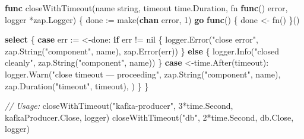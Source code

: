 \documentclass[
]{article}
\newenvironment{Shaded}{}{}
\newcommand{\BuiltInTok}[1]{\textcolor[rgb]{0.00,0.50,0.00}{#1}}
\newcommand{\CommentTok}[1]{\textcolor[rgb]{0.38,0.63,0.69}{\textit{#1}}}
\newcommand{\ControlFlowTok}[1]{\textcolor[rgb]{0.00,0.44,0.13}{\textbf{#1}}}
\newcommand{\DataTypeTok}[1]{\textcolor[rgb]{0.56,0.13,0.00}{#1}}
\newcommand{\DecValTok}[1]{\textcolor[rgb]{0.25,0.63,0.44}{#1}}
\newcommand{\KeywordTok}[1]{\textcolor[rgb]{0.00,0.44,0.13}{\textbf{#1}}}
\newcommand{\NormalTok}[1]{#1}
\newcommand{\OperatorTok}[1]{\textcolor[rgb]{0.40,0.40,0.40}{#1}}
\newcommand{\OtherTok}[1]{\textcolor[rgb]{0.00,0.44,0.13}{#1}}
\newcommand{\StringTok}[1]{\textcolor[rgb]{0.25,0.44,0.63}{#1}}
\begin{document}
\begin{Shaded}
\begin{Highlighting}[]
\KeywordTok{func}\NormalTok{ closeWithTimeout}\OperatorTok{(}\NormalTok{name }\DataTypeTok{string}\OperatorTok{,}\NormalTok{ timeout time}\OperatorTok{.}\NormalTok{Duration}\OperatorTok{,}\NormalTok{ fn }\KeywordTok{func}\OperatorTok{()} \DataTypeTok{error}\OperatorTok{,}\NormalTok{ logger }\OperatorTok{*}\NormalTok{zap}\OperatorTok{.}\NormalTok{Logger}\OperatorTok{)} \OperatorTok{\{}
\NormalTok{    done }\OperatorTok{:=} \BuiltInTok{make}\OperatorTok{(}\KeywordTok{chan} \DataTypeTok{error}\OperatorTok{,} \DecValTok{1}\OperatorTok{)}
    \ControlFlowTok{go} \KeywordTok{func}\OperatorTok{()} \OperatorTok{\{}\NormalTok{ done }\OperatorTok{\textless{}{-}}\NormalTok{ fn}\OperatorTok{()} \OperatorTok{\}()}

    \ControlFlowTok{select} \OperatorTok{\{}
    \ControlFlowTok{case}\NormalTok{ err }\OperatorTok{:=} \OperatorTok{\textless{}{-}}\NormalTok{done}\OperatorTok{:}
        \ControlFlowTok{if}\NormalTok{ err }\OperatorTok{!=} \OtherTok{nil} \OperatorTok{\{}
\NormalTok{            logger}\OperatorTok{.}\NormalTok{Error}\OperatorTok{(}\StringTok{"close error"}\OperatorTok{,}\NormalTok{ zap}\OperatorTok{.}\NormalTok{String}\OperatorTok{(}\StringTok{"component"}\OperatorTok{,}\NormalTok{ name}\OperatorTok{),}\NormalTok{ zap}\OperatorTok{.}\NormalTok{Error}\OperatorTok{(}\NormalTok{err}\OperatorTok{))}
        \OperatorTok{\}} \ControlFlowTok{else} \OperatorTok{\{}
\NormalTok{            logger}\OperatorTok{.}\NormalTok{Info}\OperatorTok{(}\StringTok{"closed cleanly"}\OperatorTok{,}\NormalTok{ zap}\OperatorTok{.}\NormalTok{String}\OperatorTok{(}\StringTok{"component"}\OperatorTok{,}\NormalTok{ name}\OperatorTok{))}
        \OperatorTok{\}}
    \ControlFlowTok{case} \OperatorTok{\textless{}{-}}\NormalTok{time}\OperatorTok{.}\NormalTok{After}\OperatorTok{(}\NormalTok{timeout}\OperatorTok{):}
\NormalTok{        logger}\OperatorTok{.}\NormalTok{Warn}\OperatorTok{(}\StringTok{"close timeout — proceeding"}\OperatorTok{,}
\NormalTok{            zap}\OperatorTok{.}\NormalTok{String}\OperatorTok{(}\StringTok{"component"}\OperatorTok{,}\NormalTok{ name}\OperatorTok{),}
\NormalTok{            zap}\OperatorTok{.}\NormalTok{Duration}\OperatorTok{(}\StringTok{"timeout"}\OperatorTok{,}\NormalTok{ timeout}\OperatorTok{),}
        \OperatorTok{)}
    \OperatorTok{\}}
\OperatorTok{\}}

\CommentTok{// Usage:}
\NormalTok{closeWithTimeout}\OperatorTok{(}\StringTok{"kafka{-}producer"}\OperatorTok{,} \DecValTok{3}\OperatorTok{*}\NormalTok{time}\OperatorTok{.}\NormalTok{Second}\OperatorTok{,}\NormalTok{ kafkaProducer}\OperatorTok{.}\NormalTok{Close}\OperatorTok{,}\NormalTok{ logger}\OperatorTok{)}
\NormalTok{closeWithTimeout}\OperatorTok{(}\StringTok{"db"}\OperatorTok{,}             \DecValTok{2}\OperatorTok{*}\NormalTok{time}\OperatorTok{.}\NormalTok{Second}\OperatorTok{,}\NormalTok{ db}\OperatorTok{.}\NormalTok{Close}\OperatorTok{,}\NormalTok{             logger}\OperatorTok{)}
\end{Highlighting}
\end{Shaded}
\end{document}
